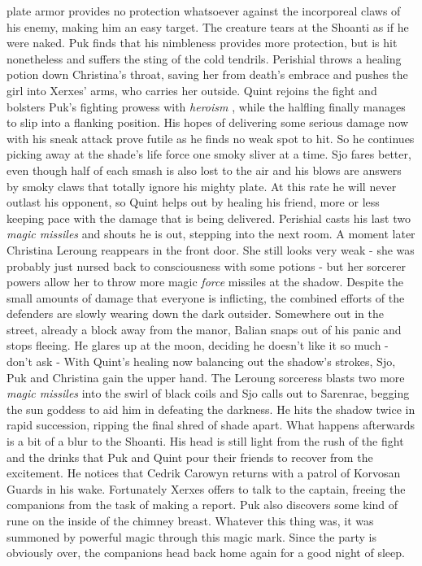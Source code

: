 plate armor provides no protection whatsoever against the incorporeal claws of his enemy, making him an easy target. The creature tears at the Shoanti as if he were naked. Puk finds that his nimbleness provides more protection, but is hit nonetheless and suffers the sting of the cold tendrils. Perishial throws a healing potion down Christina's throat, saving her from death's embrace and pushes the girl into Xerxes' arms, who carries her outside. Quint rejoins the fight and bolsters Puk's fighting prowess with {\itshape heroism} , while the halfling finally manages to slip into a flanking position. His hopes of delivering some serious damage now with his sneak attack prove futile as he finds no weak spot to hit. So he continues picking away at the shade's life force one smoky sliver at a time. Sjo fares better, even though half of each smash is also lost to the air and his blows are answers by smoky claws that totally ignore his mighty plate. At this rate he will never outlast his opponent, so Quint helps out by healing his friend, more or less keeping pace with the damage that is being delivered. Perishial casts his last two {\itshape magic missiles} and shouts he is out, stepping into the next room. A moment later Christina Leroung reappears in the front door. She still looks very weak - she was probably just nursed back to consciousness with some potions - but her sorcerer powers allow her to throw more magic  {\itshape force} missiles at the shadow. Despite the small amounts of damage that everyone is inflicting, the combined efforts of the defenders are slowly wearing down the dark outsider. Somewhere out in the street, already a block away from the manor, Balian snaps out of his panic and stops fleeing. He glares up at the moon, deciding he doesn't like it so much - don't ask - With Quint's healing now balancing out the shadow's strokes, Sjo, Puk and Christina gain the upper hand. The Leroung sorceress blasts two more {\itshape magic missiles} into the swirl of black coils and Sjo calls out to Sarenrae, begging the sun goddess to aid him in defeating the darkness. He hits the shadow twice in rapid succession, ripping the final shred of shade apart. What happens afterwards is a bit of a blur to the Shoanti. His head is still light from the rush of the fight and the drinks that Puk and Quint pour their friends to recover from the excitement. He notices that Cedrik Carowyn returns with a patrol of Korvosan Guards in his wake. Fortunately Xerxes offers to talk to the captain, freeing the companions from the task of making a report. Puk also discovers some kind of rune on the inside of the chimney breast. Whatever this thing was, it was summoned by powerful magic through this magic mark. Since the party is obviously over, the companions head back home again for a good night of sleep.\\

